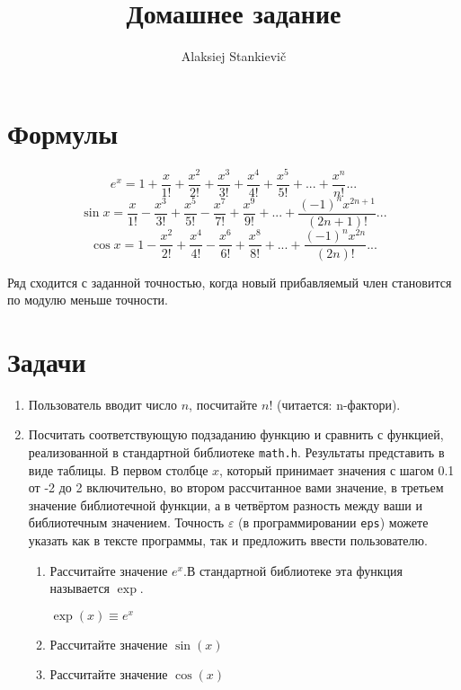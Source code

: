 \documentclass[12pt]{article}
\author{Alaksiej Stankievič}
\title{Домашнее задание}
\begin{document}


\section{Формулы}
\begin{equation}
 e^x = 1 + \frac{x}{1!}+\frac{x^2}{2!}+\frac{x^3}{3!}+\frac{x^4}{4!}+\frac{x^5}{5!}+...+\frac{x^n}{n!}...
\end{equation}
\begin{equation}
 \sin{x} = \frac{x}{1!}-\frac{x^3}{3!}+\frac{x^5}{5!}-\frac{x^7}{7!}+\frac{x^9}{9!}+...+\frac{(-1)^{n}x^{2n+1}}{(2n+1)!}...
\end{equation}
\begin{equation}
 \cos{x} = 1 - \frac{x^2}{2!}+\frac{x^4}{4!}-\frac{x^6}{6!}+\frac{x^8}{8!}+...+\frac{(-1)^{n}x^{2n}}{(2n)!}...
\end{equation}

Ряд сходится с заданной точностью, когда новый прибавляемый член становится по модулю меньше точности.

\section{Задачи}


\begin{enumerate}
 \item Пользователь вводит число $n$, посчитайте $n!$ (читается: n-фактори).
 \item Посчитать соответствующую подзаданию функцию и сравнить с функцией, реализованной в стандартной библиотеке 
\verb|math.h|. 
Результаты представить в виде таблицы. В первом столбце $x$, который принимает значения с шагом 0.1 от -2 до 2 
включительно, во втором рассчитанное вами значение, в третьем значение библиотечной функции, а в четвёртом разность 
между ваши и библиотечным значением. Точность $\varepsilon$ (в программировании \verb|eps|) можете указать как в тексте 
программы, так и предложить ввести пользователю.
\begin{enumerate}
  \item Рассчитайте значение $e^x$.В стандартной библиотеке эта функция называется $\exp$. 
 
 $\exp(x) \equiv e^x$
 \item Рассчитайте значение $\sin(x)$
 \item Рассчитайте значение $\cos(x)$
\end{enumerate}
\end{enumerate}
\end{document}
